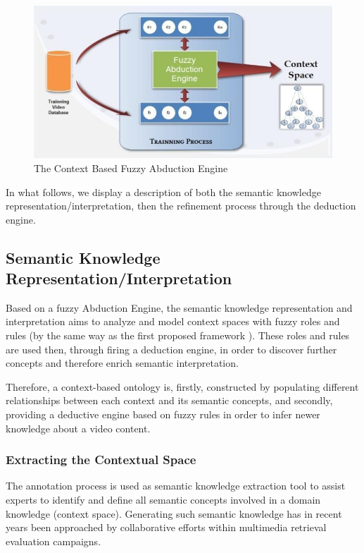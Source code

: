 			\begin{figure}[h]
				\centering
				\includegraphics[scale=0.5]{graphics/contrib1::abduction2}
				\caption{The Context Based Fuzzy Abduction Engine}
				\label{abduction}
			\end{figure}
			
			In what follows, we display a description of both the semantic knowledge 
			representation/interpretation, then the refinement  process through the deduction engine.

				\subsection{Semantic Knowledge Representation/Interpretation}
				
				Based on a fuzzy Abduction Engine, the semantic knowledge representation and 	
				interpretation aims to analyze and model context spaces with fuzzy roles and rules 
				(by the same way as the first proposed framework \citep{Zarka2011}). These roles and 
				rules are used then, through firing a deduction engine, in order to discover further
				concepts and therefore enrich semantic interpretation.
			
				Therefore, a context-based ontology is, firstly, constructed  by populating different 
				relationships between each context and its semantic concepts, and secondly, providing 
				a deductive engine based on fuzzy rules in order to infer newer knowledge about a video content.

					\subsubsection{Extracting the Contextual Space} 
					The annotation process is used as semantic knowledge extraction tool to assist 
					experts to identify and define all semantic concepts involved in a domain 
					knowledge (context space). Generating such semantic knowledge has in recent 
					years been approached by collaborative efforts within multimedia retrieval 
					evaluation campaigns. 

